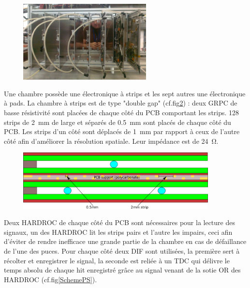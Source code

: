 \begin{figure}[ht!]
	\centering
	\includegraphics[width=0.6\textwidth]{GLA/TelescopePS.png}
	\label{TelescopePS}
\end{figure}

Une chambre possède une électronique à strips et les sept autres une électronique à pads. La chambre à strips est de type "double gap" (cf.fig\ref{DoubleGap}) : deux GRPC de basse résistivité sont placées de chaque côté du PCB comportant les strips. \num{128} strips de \SI{2}{\milli\meter} de large et séparés de \SI{0.5}{\milli\meter} sont placés de chaque côté du PCB. Les strips d'un côté sont déplacés de \SI{1}{\milli\meter} par rapport à ceux de l'autre côté afin d'améliorer la résolution spatiale. Leur impédance est de \SI{24}{\ohm}. 

\begin{figure}[ht!]
	\centering
	\includegraphics[width=0.9\textwidth]{GLA/DoubleGap.png}
	\label{DoubleGap}
\end{figure}

Deux HARDROC de chaque côté du PCB sont nécessaires pour la lecture des signaux, un des HARDROC lit les strips pairs et l'autre les impairs, ceci afin d'éviter de rendre inefficace une grande partie de la chambre en cas de défaillance de l'une des puces. Pour chaque côté deux DIF sont utilisées, la première sert à récolter et enregistrer le signal, la seconde est reliée à un TDC qui délivre le temps absolu de chaque hit enregistré grâce au signal venant de la sotie OR des HARDROC (cf.fig\ref{SchemePS}).

